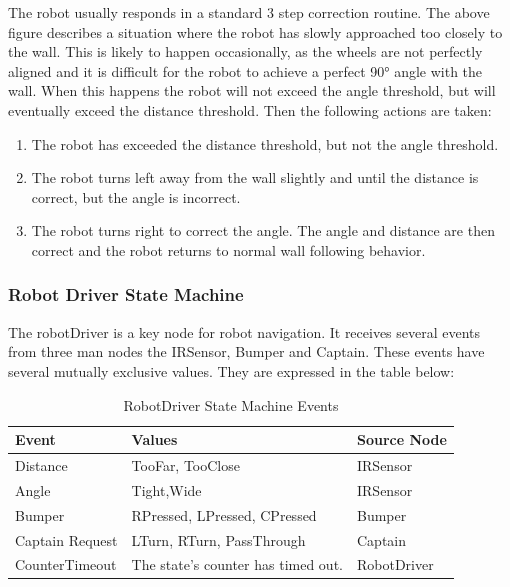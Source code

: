 \documentclass[12pt]{report}
\begin{document}
The robot usually responds in a standard 3 step correction routine. The above figure describes a situation where the robot has slowly approached too closely to the wall. This is likely to happen occasionally, as the wheels are not perfectly aligned and it is difficult for the robot to achieve a perfect 90° angle with the wall. When this happens the robot will not exceed the angle threshold, but will eventually exceed the distance threshold. Then the following actions are taken:
\begin{enumerate}
    \item The robot has exceeded the distance threshold, but not the angle threshold.
    \item The robot turns left away from the wall slightly and until the distance is correct, but the angle is incorrect.
    \item The robot turns right to correct the angle. The  angle and distance are then correct and the robot returns to normal wall following behavior.
\end{enumerate}

\subsubsection{Robot Driver State Machine}
The robotDriver is a key node for robot navigation. It receives several events from three man nodes the IRSensor, Bumper and Captain. These events have several mutually exclusive values. They are expressed in the table below:

\begin{table}[H]
\centering
\caption{RobotDriver State Machine Events}
\label{State Machine Events}
\centering
\begin{tabular} { | p{3cm} | p{8cm} | p{3cm} | }
\hline
\textbf{Event} & \textbf{Values} & \textbf{Source Node} \\
\hline
Distance & TooFar, TooClose & IRSensor\\
\hline
Angle & Tight,Wide & IRSensor\\
\hline
Bumper & RPressed, LPressed, CPressed & Bumper\\
\hline
Captain Request & LTurn, RTurn, PassThrough & Captain \\
\hline
CounterTimeout & The state's counter has timed out. & RobotDriver\\
\hline
\end{tabular}
\end{table}%
\end{document}
